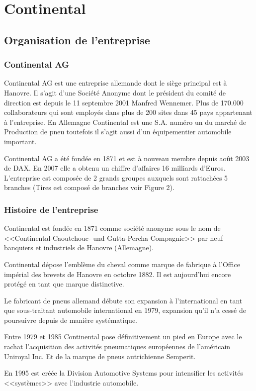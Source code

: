 \chapter{Continental}
	\section{Organisation de l'entreprise}
		\subsection{Continental AG}
		Continental AG est une entreprise allemande dont le siège principal est à Hanovre. Il s’agit d’une Société Anonyme dont le président du comité de direction est depuis le 11 septembre 2001 Manfred Wennemer. Plus de 170.000 collaborateurs qui sont employés dans plus de 200 sites dans 45 pays appartenant à l'entreprise. En Allemagne Continental est une S.A. numéro un du marché de Production de pneu toutefois il s’agit aussi d’un équipementier automobile important. 

		Continental AG a été fondée en 1871 et est à nouveau membre depuis août 2003 de DAX. En 2007 elle a obtenu un chiffre d'affaires 16 milliards d'Euros. L'entreprise est composée de 2 grands groupes auxquels sont rattachées 5 branches (Tires est composé de branches voir Figure 2).

		\subsection{Histoire de l'entreprise}
		Continental est fondée en 1871 comme société anonyme sous le nom de <<Continental-Caoutchouc- und Gutta-Percha Compagnie>> par neuf banquiers et industriels de Hanovre (Allemagne).

		Continental dépose l'emblème du cheval comme marque de fabrique à l'Office impérial des brevets de Hanovre en octobre 1882. Il est aujourd'hui encore protégé en tant que marque distinctive.

		Le fabricant de pneus allemand débute son expansion à l'international en tant que sous-traitant automobile international en 1979, expansion qu'il n'a cessé de poursuivre depuis de manière systématique.
		
		Entre 1979 et 1985 Continental pose définitivement un pied en Europe avec le rachat l'acquisition des activités pneumatiques européennes de l'américain Uniroyal Inc. Et de la marque de pneus autrichienne Semperit.

		En 1995 est créée la Division Automotive Systems pour intensifier les activités <<systèmes>> avec l'industrie automobile.

